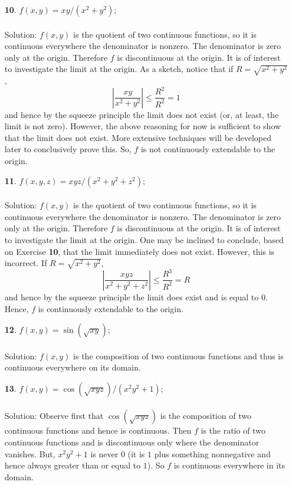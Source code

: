 \documentclass[12pt]{amsbook}
\begin{document}
\begin{enumerate}
  \item[{\small\bf 10}.] $f(x,y)=xy/(x^2+y^2)$;
  \\
  \\
  {\sc Solution}: $f(x,y)$ is the quotient of two continuous functions, so it is continuous everywhere the denominator is nonzero. The denominator is zero only at the origin. Therefore $f$ is discontinuous at the origin. It is of interest to investigate the limit at the origin. As a sketch, notice that if $R=\sqrt{x^2+y^2}$,
  $$|\frac{xy}{x^2+y^2}|\leq \frac{R^2}{R^2}=1$$
  and hence by the squeeze principle the limit does not exist (or, at least, the limit is not zero). However, the above reasoning for now is sufficient to show that the limit does not exist. More extensive techniques will be developed later to conclusively prove this. So, $f$ is not continuously extendable to the origin.
  \\
  \item[{\small\bf 11}.] $f(x,y,z)=xyz/(x^2+y^2+z^2)$;
  \\
  \\
  {\sc Solution}: $f(x,y)$ is the quotient of two continuous functions, so it is continuous everywhere the denominator is nonzero. The denominator is zero only at the origin. Therefore $f$ is discontinuous at the origin. It is of interest to investigate the limit at the origin. One  may be inclined to conclude, based on Exercise {\bf 10}, that the limit immediately does not exist. However, this is incorrect. If $R=\sqrt{x^2+y^2}$,
  $$|\frac{xyz}{x^2+y^2+z^2}|\leq \frac{R^3}{R^2}=R$$
  and hence by the squeeze principle the limit does exist and is equal to $0$. Hence, $f$ is continuously extendable to the origin.
  \\
  \item[{\small\bf 12}.] $f(x,y)=\sin(\sqrt{xy})$;
  \\
  \\
  {\sc Solution}: $f(x,y)$ is the composition of two continuous functions and thus is continuous everywhere on its domain.
  \\
  \item[{\small\bf 13}.] $f(x,y)=\cos(\sqrt{xyz})/(x^2y^2+1)$;
  \\
  \\
  {\sc Solution}: Observe first that $\cos(\sqrt{xyz})$ is the composition of two continuous functions and hence is continuous. Then $f$ is the ratio of two continuous functions and is discontinuous only where the denominator vanishes. But, $x^2y^2+1$ is never $0$ (it is $1$ plus something nonnegative and hence always greater than or equal to $1$). So $f$ is continuous everywhere in its domain.

\end{enumerate}
\end{document}
